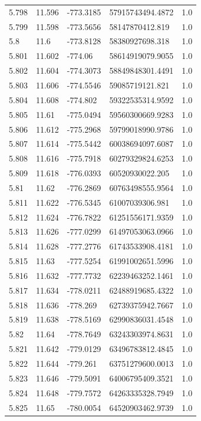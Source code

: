 \begin{tabular}{lllll}
5.798 & 11.596 & -773.3185 & 57915743494.4872 & 1.0 \\
5.799 & 11.598 & -773.5656 & 58147870412.819 & 1.0 \\
5.8 & 11.6 & -773.8128 & 58380927698.318 & 1.0 \\
5.801 & 11.602 & -774.06 & 58614919079.9055 & 1.0 \\
5.802 & 11.604 & -774.3073 & 58849848301.4491 & 1.0 \\
5.803 & 11.606 & -774.5546 & 59085719121.821 & 1.0 \\
5.804 & 11.608 & -774.802 & 59322535314.9592 & 1.0 \\
5.805 & 11.61 & -775.0494 & 59560300669.9283 & 1.0 \\
5.806 & 11.612 & -775.2968 & 59799018990.9786 & 1.0 \\
5.807 & 11.614 & -775.5442 & 60038694097.6087 & 1.0 \\
5.808 & 11.616 & -775.7918 & 60279329824.6253 & 1.0 \\
5.809 & 11.618 & -776.0393 & 60520930022.205 & 1.0 \\
5.81 & 11.62 & -776.2869 & 60763498555.9564 & 1.0 \\
5.811 & 11.622 & -776.5345 & 61007039306.981 & 1.0 \\
5.812 & 11.624 & -776.7822 & 61251556171.9359 & 1.0 \\
5.813 & 11.626 & -777.0299 & 61497053063.0966 & 1.0 \\
5.814 & 11.628 & -777.2776 & 61743533908.4181 & 1.0 \\
5.815 & 11.63 & -777.5254 & 61991002651.5996 & 1.0 \\
5.816 & 11.632 & -777.7732 & 62239463252.1461 & 1.0 \\
5.817 & 11.634 & -778.0211 & 62488919685.4322 & 1.0 \\
5.818 & 11.636 & -778.269 & 62739375942.7667 & 1.0 \\
5.819 & 11.638 & -778.5169 & 62990836031.4548 & 1.0 \\
5.82 & 11.64 & -778.7649 & 63243303974.8631 & 1.0 \\
5.821 & 11.642 & -779.0129 & 63496783812.4845 & 1.0 \\
5.822 & 11.644 & -779.261 & 63751279600.0013 & 1.0 \\
5.823 & 11.646 & -779.5091 & 64006795409.3521 & 1.0 \\
5.824 & 11.648 & -779.7572 & 64263335328.7949 & 1.0 \\
5.825 & 11.65 & -780.0054 & 64520903462.9739 & 1.0 \\

\end{tabular}
